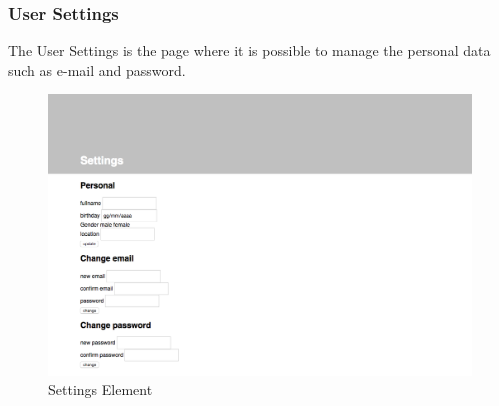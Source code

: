 \subsubsection{User Settings}

The User Settings is the page where it is possible to manage the personal data such as e-mail and password.

\begin {figure}[h]
\graphicspath{{images/chapter_USR/}}
\includegraphics[width=\textwidth]{usr2}
\caption{Settings  Element}
\end {figure}
